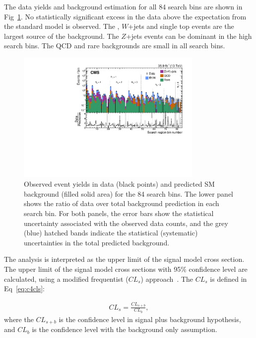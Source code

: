 The data yields and background estimation for all 84 search bins are shown in Fig~\ref{fig:84sbunblind}. No statistically significant excess in the data above the expectation from the standard model is observed. The \ttbar, $W$+jets and single top events are the largest source of the background. The $Z$+jets events can be dominant in the high \MET search bins. The QCD and rare backgrounds are small in all search bins. 

\begin{figure}[htbp]
 \begin{center}
  \includegraphics[width=0.8\textwidth]{sections/mc4/Results/figures/UnblindPlots.pdf}
 \end{center}
 \caption{Observed event yields in data (black points) and predicted SM background (filled solid area) for the 84 search bins. The lower panel shows the ratio of data over total background prediction in each search bin. For both panels, the error bars show the statistical uncertainty associated with the observed data counts, and the grey (blue) hatched bands indicate the statistical (systematic) uncertainties in the total predicted background.}
 \label{fig:84sbunblind}
\end{figure}

The analysis is interpreted as the upper limit of the signal model cross section. The upper limit of the signal model cross sections with 95\% confidence level are calculated, using a modified frequentist ($CL_{s}$) approach~\cite{Cowan:2010js}. The $CL_{s}$ is defined in Eq~\ref{eq:c4cls}:

\begin{equation}
 \begin{aligned}
  CL_{s}=\frac{CL_{s+b}}{CL_{b}},
 \end{aligned}
 \label{eq:c4cls}
\end{equation}
where the $CL_{s+b}$ is the confidence level in signal plus background hypothesis, and $CL_{b}$ is the confidence level with the background only assumption. 

